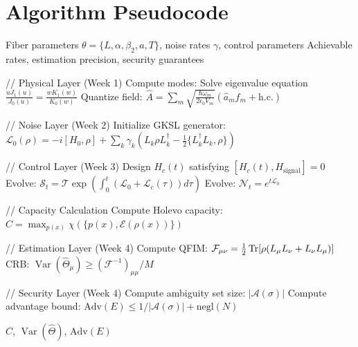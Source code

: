 \documentclass[12pt]{article}
\newcommand{\Var}{\operatorname{Var}}
\begin{document}
\section{Algorithm Pseudocode}

\begin{algorithm}[H]
\caption{Integrated Communication System Simulation}
\begin{algorithmic}[1]
\REQUIRE Fiber parameters \(\theta = \{L, \alpha, \beta_2, a, T\}\), noise rates \(\gamma\), control parameters
\ENSURE Achievable rates, estimation precision, security guarantees

\STATE // Physical Layer (Week 1)
\STATE Compute modes: Solve eigenvalue equation \(\frac{uJ_1(u)}{J_0(u)} = \frac{wK_1(w)}{K_0(w)}\)
\STATE Quantize field: \(\hat{A} = \sum_m \sqrt{\frac{\hbar\omega_m}{2\epsilon_0 V_m}}(\hat{a}_m f_m + \text{h.c.})\)

\STATE // Noise Layer (Week 2)
\STATE Initialize GKSL generator: \(\mathcal{L}_0(\rho) = -i[H_0,\rho] + \sum_k \gamma_k(L_k\rho L_k^\dagger - \frac{1}{2}\{L_k^\dagger L_k,\rho\})\)

\STATE // Control Layer (Week 3)
    \STATE Design \(H_c(t)\) satisfying \([H_c(t), H_{\text{signal}}] = 0\)
    \STATE Evolve: \(\mathcal{S}_t = \mathcal{T}\exp\left(\int_0^t (\mathcal{L}_0 + \mathcal{L}_c(\tau))d\tau\right)\)
\ELSE
    \STATE Evolve: \(\mathcal{N}_t = e^{t\mathcal{L}_0}\)
\ENDIF

\STATE // Capacity Calculation
\STATE Compute Holevo capacity: \(C = \max_{p(x)} \chi(\{p(x), \mathcal{E}(\rho(x))\})\)

\STATE // Estimation Layer (Week 4)
\STATE Compute QFIM: \(\mathcal{F}_{\mu\nu} = \frac{1}{2}\Tr[\rho (L_\mu L_\nu + L_\nu L_\mu)]\)
\STATE CRB: \(\Var(\hat{\Theta}_\mu) \geq (\mathcal{F}^{-1})_{\mu\mu}/M\)

\STATE // Security Layer (Week 4)
\STATE Compute ambiguity set size: \(|\mathcal{A}(\sigma)|\)
\STATE Compute advantage bound: \(\text{Adv}(E) \leq 1/|\mathcal{A}(\sigma)| + \text{negl}(N)\)

\RETURN \(C\), \(\Var(\hat{\Theta})\), \(\text{Adv}(E)\)
\end{algorithmic}
\end{algorithm}
\end{document}
